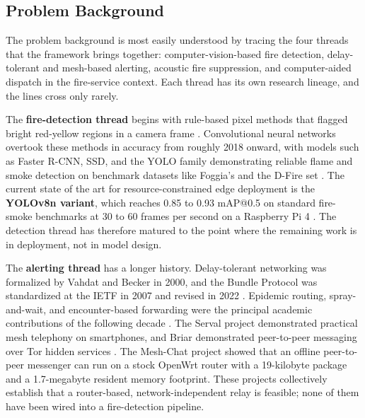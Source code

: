 \subsection{Problem Background}

The problem background is most easily understood by tracing the four threads that the framework brings together: computer-vision-based fire detection, delay-tolerant and mesh-based alerting, acoustic fire suppression, and computer-aided dispatch in the fire-service context. Each thread has its own research lineage, and the lines cross only rarely.

The \textbf{fire-detection thread} begins with rule-based pixel methods that flagged bright red-yellow regions in a camera frame \cite{celik2010fire}. Convolutional neural networks overtook these methods in accuracy from roughly 2018 onward, with models such as Faster R-CNN, SSD, and the YOLO family demonstrating reliable flame and smoke detection on benchmark datasets like Foggia's and the D-Fire set \cite{dunnhofer2023dfire}. The current state of the art for resource-constrained edge deployment is the \textbf{YOLOv8n variant}, which reaches 0.85 to 0.93 mAP@0.5 on standard fire-smoke benchmarks at 30 to 60 frames per second on a Raspberry Pi 4 \cite{ultralytics2023yolov8,yasar2024fireyolo}. The detection thread has therefore matured to the point where the remaining work is in deployment, not in model design.

The \textbf{alerting thread} has a longer history. Delay-tolerant networking was formalized by Vahdat and Becker in 2000, and the Bundle Protocol was standardized at the IETF in 2007 and revised in 2022 \cite{vahdat2000,rfc9171}. Epidemic routing, spray-and-wait, and encounter-based forwarding were the principal academic contributions of the following decade \cite{spyropoulos2005}. The Serval project demonstrated practical mesh telephony on smartphones, and Briar demonstrated peer-to-peer messaging over Tor hidden services \cite{serval2013,briar2018}. The Mesh-Chat project \cite{meshchat2026} showed that an offline peer-to-peer messenger can run on a stock OpenWrt router with a 19-kilobyte package and a 1.7-megabyte resident memory footprint. These projects collectively establish that a router-based, network-independent relay is feasible; none of them have been wired into a fire-detection pipeline.

